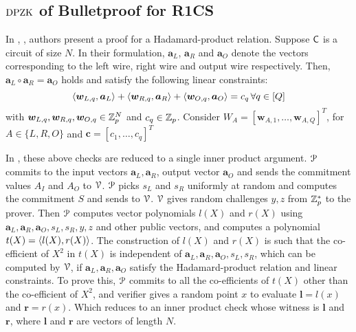 \subsection{$\text{DPZK}$ of Bulletproof for R1CS}\label{app:BulletproofsDPZK}
In \cite{InnerProductDLS}, \cite{bulletproofs}, authors present a proof for a Hadamard-product relation. Suppose $\mathsf{C}$ is a circuit of size $N$. In their formulation,  $\bm{a}_L$, $\bm{a}_R$ and $\bm{a}_O$ denote the vectors corresponding to the left wire, right wire and output wire respectively. Then, $\bm{a}_L \circ \bm{a}_R = \bm{a}_O$ holds and satisfy the following linear constraints: 
$$\langle \bm{w}_{L,q},\bm{a}_L\rangle + \langle \bm{w}_{R,q},\bm{a}_R\rangle + \langle \bm{w}_{O,q},\bm{a}_O\rangle = c_q \, \forall q\in [Q]$$
with $\bm{w}_{L,q}, \bm{w}_{R,q}, \bm{w}_{O,q} \in \mathbb{Z}^N_p$ and $c_q \in \mathbb{Z}_p$.
Consider
$W_A = [\bm{w}_{A,1}, \ldots, \bm{w}_{A,Q}]^T$, for $A\in \{L,R,O\}$  
and $\bm{c} = [c_1, \ldots, c_q]^T$

\noindent In \cite{bulletproofs}, these above checks are reduced to a single inner product argument. $\mathcal{P}$ commits to the input vectors $\bm{a}_L, \bm{a}_R$, output vector $\bm{a}_O$ and sends the commitment values $A_I$ and $A_O$ to $\mathcal{V}$. $\mathcal{P}$ picks $s_L$ and $s_R$ uniformly at random and computes the commitment $S$ and sends to $\mathcal{V}$.
$\mathcal{V}$ gives random challenges $y, z$ from $\mathbb{Z}^\ast_p$ to the prover.
Then $\mathcal{P}$ computes vector polynomials $l(X)$ and $r(X)$ using $\bm{a}_L, \bm{a}_R, \bm{a}_O, s_L, s_R, y, z$ and other public vectors, and computes a polynomial $t(X) = \langle l(X),r(X)\rangle$. The construction of $l(X)$ and $r(X)$ is such that the co-efficient of $X^2$ in $t(X)$ is independent of $\bm{a}_L, \bm{a}_R, \bm{a}_O, s_L, s_R$, which can be computed by $\mathcal{V}$, if $\bm{a}_L, \bm{a}_R, \bm{a}_O$ satisfy the Hadamard-product relation and linear constraints. To prove this, $\mathcal{P}$ commits to all the co-efficients of $t(X)$ other than the co-efficient of $X^2$, and verifier gives a random point $x$ to evaluate $\bm{l} = l(x)$ and $\bm{r} = r(x)$. Which reduces to an inner product check whose witness is $\bm{l}$ and $\bm{r}$, where $\bm{l}$ and $\bm{r}$ are vectors of length $N$. 
\smallskip

